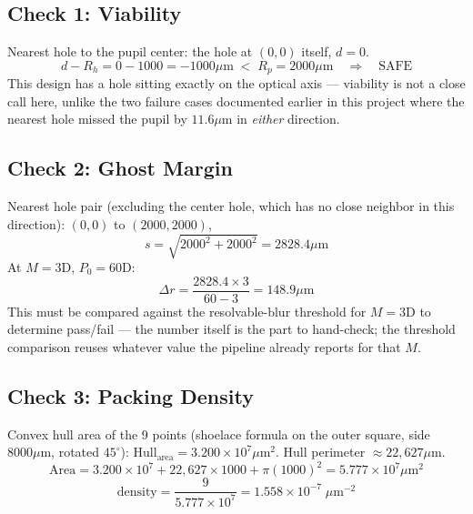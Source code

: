 \subsection{Check 1: Viability}
Nearest hole to the pupil center: the hole at $(0,0)$ itself, $d=0$.
\begin{equation}
d - R_h = 0 - 1000 = -1000\mu\text{m} \;<\; R_p = 2000\mu\text{m} \quad\Rightarrow\quad \text{SAFE}
\end{equation}
This design has a hole sitting exactly on the optical axis --- viability is
not a close call here, unlike the two failure cases documented earlier in
this project where the nearest hole missed the pupil by $11.6\mu$m in
\emph{either} direction.

\subsection{Check 2: Ghost Margin}
Nearest hole pair (excluding the center hole, which has no close neighbor
in this direction): $(0,0)$ to $(2000,2000)$,
\begin{equation}
s = \sqrt{2000^2+2000^2} = 2828.4\mu\text{m}
\end{equation}
At $M=3$D, $P_0=60$D:
\begin{equation}
\Delta r = \frac{2828.4 \times 3}{60-3} = 148.9\mu\text{m}
\end{equation}
This must be compared against the resolvable-blur threshold for $M{=}3$D to
determine pass/fail --- the number itself is the part to hand-check; the
threshold comparison reuses whatever value the pipeline already reports for
that $M$.

\subsection{Check 3: Packing Density}
Convex hull area of the 9 points (shoelace formula on the outer square,
side $8000\mu$m, rotated $45^\circ$): $\text{Hull}_{\text{area}} =
3.200\times10^{7}\mu\text{m}^2$. Hull perimeter $\approx 22{,}627\mu$m.
\begin{equation}
\text{Area} = 3.200\times10^7 + 22{,}627\times1000 + \pi(1000)^2 = 5.777\times10^7\mu\text{m}^2
\end{equation}
\begin{equation}
\text{density} = \frac{9}{5.777\times10^7} = 1.558\times10^{-7}\;\mu\text{m}^{-2}
\end{equation}

